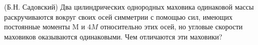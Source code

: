 (Б.Н. Садовский)
Два цилиндрических однородных маховика одинаковой массы раскручиваются
вокруг своих осей симметрии с помощью сил, имеющих постоянные
моменты M и $4M$ относительно этих осей, но угловые скорости маховиков
оказываются одинаковыми. Чем отличаются эти маховики?
